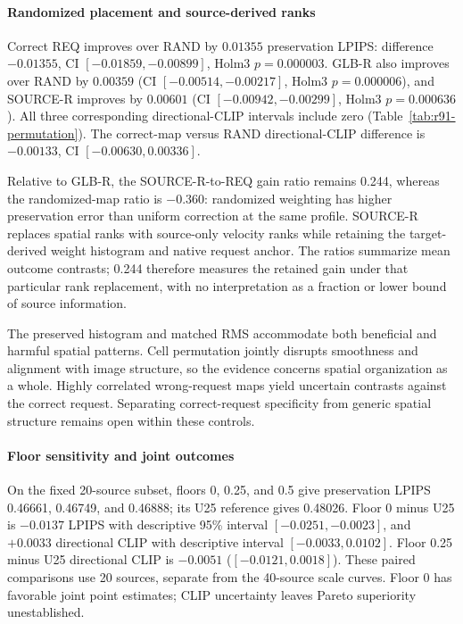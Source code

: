 \paragraph{Randomized placement and source-derived ranks}
Correct REQ improves over RAND by $0.01355$ preservation LPIPS: difference $-0.01355$, CI $[-0.01859,-0.00899]$, Holm3 $p=0.000003$. GLB-R also improves over RAND by $0.00359$ (CI $[-0.00514,-0.00217]$, Holm3 $p=0.000006$), and SOURCE-R improves by $0.00601$ (CI $[-0.00942,-0.00299]$, Holm3 $p=0.000636$). All three corresponding directional-CLIP intervals include zero (Table~\ref{tab:r91-permutation}). The correct-map versus RAND directional-CLIP difference is $-0.00133$, CI $[-0.00630,0.00336]$.

Relative to GLB-R, the SOURCE-R-to-REQ gain ratio remains 0.244, whereas the randomized-map ratio is $-0.360$: randomized weighting has higher preservation error than uniform correction at the same profile. SOURCE-R replaces spatial ranks with source-only velocity ranks while retaining the target-derived weight histogram and native request anchor. The ratios summarize mean outcome contrasts; 0.244 therefore measures the retained gain under that particular rank replacement, with no interpretation as a fraction or lower bound of source information.

The preserved histogram and matched RMS accommodate both beneficial and harmful spatial patterns. Cell permutation jointly disrupts smoothness and alignment with image structure, so the evidence concerns spatial organization as a whole. Highly correlated wrong-request maps yield uncertain contrasts against the correct request. Separating correct-request specificity from generic spatial structure remains open within these controls.

\paragraph{Floor sensitivity and joint outcomes}
On the fixed 20-source subset, floors 0, 0.25, and 0.5 give preservation LPIPS 0.46661, 0.46749, and 0.46888; its U25 reference gives 0.48026. Floor 0 minus U25 is $-0.0137$ LPIPS with descriptive 95\% interval $[-0.0251,-0.0023]$, and $+0.0033$ directional CLIP with descriptive interval $[-0.0033,0.0102]$. Floor 0.25 minus U25 directional CLIP is $-0.0051$ ($[-0.0121,0.0018]$). These paired comparisons use 20 sources, separate from the 40-source scale curves. Floor 0 has favorable joint point estimates; CLIP uncertainty leaves Pareto superiority unestablished.


